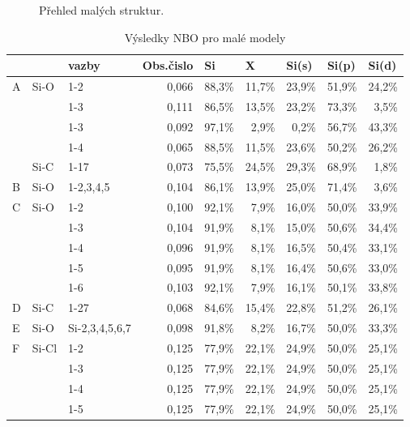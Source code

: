 \documentclass[
  digital, %
  table,   %
  lof,     %
  lot,     %
  oneside,
]{fithesis3}
\begin{document}
\begin{figure}
\begin{center}
\caption{Přehled malých struktur.}
\label{prehled_male_modely}

\end{center}
\end{figure}
\begin{table}[htbp]
\caption{Výsledky NBO pro malé modely}
\begin{center}
\begin{tabular}{|l|l|l|r|r|r|r|r|r|}
\hline
 &  & vazby & \multicolumn{1}{l|}{Obs.čislo} & \multicolumn{1}{l|}{Si} & \multicolumn{1}{l|}{X} & \multicolumn{1}{l|}{Si(s)} & \multicolumn{1}{l|}{Si(p)} & \multicolumn{1}{l|}{Si(d)} \\ \hline
A & Si-O & 1-2  & 0,066 & 88,3\% & 11,7\% & 23,9\% & 51,9\% & 24,2\% \\ \hline
 &  & 1-3 & 0,111 & 86,5\% & 13,5\% & 23,2\% & 73,3\% & 3,5\% \\ \hline
 &  & 1-3 & 0,092 & 97,1\% & 2,9\% & 0,2\% & 56,7\% & 43,3\% \\ \hline
 &  & 1-4 & 0,065 & 88,5\% & 11,5\% & 23,6\% & 50,2\% & 26,2\% \\ \hline
 & Si-C & 1-17 & 0,073 & 75,5\% & 24,5\% & 29,3\% & 68,9\% & 1,8\% \\ \hline
B & Si-O &1-2,3,4,5  & 0,104 & 86,1\% & 13,9\% & 25,0\% & 71,4\% & 3,6\% \\ \hline
C & Si-O & 1-2  & 0,100 & 92,1\% & 7,9\% & 16,0\% & 50,0\% & 33,9\% \\ \hline
 &  & 1-3 & 0,104 & 91,9\% & 8,1\% & 15,0\% & 50,6\% & 34,4\% \\ \hline
 &  & 1-4 & 0,096 & 91,9\% & 8,1\% & 16,5\% & 50,4\% & 33,1\% \\ \hline
 &  & 1-5 & 0,095 & 91,9\% & 8,1\% & 16,4\% & 50,6\% & 33,0\% \\ \hline
 &  & 1-6 & 0,103 & 92,1\% & 7,9\% & 16,1\% & 50,1\% & 33,8\% \\ \hline
 D& Si-C & 1-27 & 0,068 & 84,6\% & 15,4\% & 22,8\% & 51,2\% & 26,1\% \\ \hline
E & Si-O &Si-2,3,4,5,6,7  & 0,098 & 91,8\% & 8,2\% & 16,7\% & 50,0\% & 33,3\% \\ \hline
F & Si-Cl & 1-2  & 0,125 & 77,9\% & 22,1\% & 24,9\% & 50,0\% & 25,1\% \\ \hline
 &  & 1-3 & 0,125 & 77,9\% & 22,1\% & 24,9\% & 50,0\% & 25,1\% \\ \hline
 &  & 1-4 & 0,125 & 77,9\% & 22,1\% & 24,9\% & 50,0\% & 25,1\% \\ \hline
 &  & 1-5 & 0,125 & 77,9\% & 22,1\% & 24,9\% & 50,0\% & 25,1\% \\ \hline
\end{tabular}
\end{center}
\label{nbo_small}
\end{table}
\end{document}
